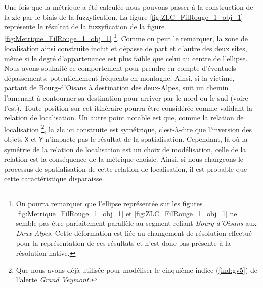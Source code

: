 Une fois que la métrique a été calculée nous pouvons passer à la
construction de la \ac{zlc} par le biais de la fuzzyfication. La
figure \ref{fig:ZLC_FilRouge_1_obj_1} représente le résultat de la
fuzzyfication de la figure \ref{fig:Metrique_FilRouge_1_obj_1}
\footnote{On pourra remarquer que l'ellipse représentée sur les
  figures \ref{fig:Metrique_FilRouge_1_obj_1} et
  \ref{fig:ZLC_FilRouge_1_obj_1} ne semble pas être parfaitement
  parallèle au segment reliant \emph{Bourg-d'Oisans} aux
  \emph{Deux-Alpes.} Cette déformation est liée au changement de
  résolution effectué pour la représentation de ces résultats et n'est
  donc pas présente à la résolution native.}.
%
Comme on peut le remarquer, la zone de localisation ainsi construite
inclut et dépasse de part et d'autre des deux sites, même si le degré
d'appartenance est plus faible que celui au centre de l'ellipse. Nous
avons souhaité ce comportement pour prendre en compte d'éventuels
dépassements, potentiellement fréquents en montagne. Ainsi, si la
victime, partant de Bourg-d'Oisans à destination des deux-Alpes, suit
un chemin l'amenant à contourner sa destination pour arriver par le
nord ou le sud (voire l'est). Toute position sur cet itinéraire pourra
être considérée comme validant la relation de localisation.
%
Un autre point notable est que, comme la relation de localisation
 \footnote{Que nous avons déjà utilisée
  pour modéliser le cinquième indice (\ref{ind:gv5}) de l'alerte
  \emph{Grand Veymont.}}, la \ac{zlc} ici construite est symétrique,
c'est-à-dire que l'inversion des objets \texttt{X} et \texttt{Y}
n'impacte pas le résultat de la spatialisation. Cependant, là où la
symétrie de la relation de localisation 
est un choix de modélisation, celle de la relation
 est la conséquence
de la métrique choisie. Ainsi, si nous changeons le processus de
spatialisation de cette relation de localisation, il est probable que
cette caractéristique disparaisse.

